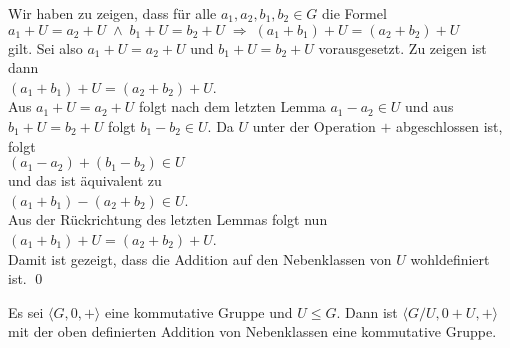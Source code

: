 \proof
Wir haben zu zeigen, dass für alle $a_1,a_2,b_1,b_2 \in G$ die Formel
\\[0.2cm]
\hspace*{1.3cm}
$a_1 + U = a_2 + U \;\wedge\; b_1 + U = b_2 + U \;\Rightarrow\; (a_1 + b_1) + U = (a_2 + b_2) + U$
\\[0.2cm]
gilt.  Sei also $a_1 + U = a_2 + U$ und $b_1 + U = b_2 + U$ vorausgesetzt.  
Zu zeigen ist dann
\\[0.2cm]
\hspace*{1.3cm}
$(a_1 + b_1) + U = (a_2 + b_2) + U$.
\\[0.2cm]
Aus $a_1 + U = a_2 + U$ folgt nach dem letzten Lemma $a_1 - a_2 \in U$  und aus
$b_1 + U = b_2 + U$ folgt $b_1 - b_2 \in U$.  Da $U$ unter der Operation $+$ abgeschlossen ist, folgt
\\[0.2cm]
\hspace*{1.3cm}
$(a_1 - a_2) + (b_1 - b_2) \in U$
\\[0.2cm]
und das ist äquivalent zu
\\[0.2cm]
\hspace*{1.3cm}
$(a_1 + b_1) - (a_2 + b_2) \in U$.
\\[0.2cm]
Aus der Rückrichtung des letzten  Lemmas folgt nun
\\[0.2cm]
\hspace*{1.3cm}
$(a_1 + b_1) + U = (a_2 + b_2) + U$.
\\[0.2cm]
Damit ist gezeigt, dass die Addition auf den Nebenklassen von $U$ wohldefiniert ist. 
\qed

\begin{Satz}
 Es sei $\langle G, 0, + \rangle$ eine kommutative Gruppe und $U \leq G$.
 Dann ist $\langle G/U, 0 + U, + \rangle$ mit der oben definierten Addition von Nebenklassen eine kommutative Gruppe.
\end{Satz}

